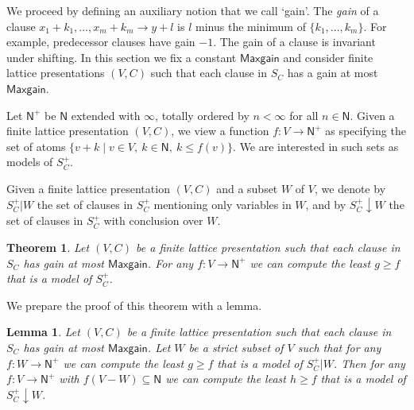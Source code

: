 \documentclass[11pt,a4paper]{article}
\newtheorem{theorem}{Theorem}[section]
\newtheorem{lemma}{Lemma}[theorem]
\newcommand{\N}{\mathsf{N}}
\newcommand\set[1]{\{#1\}}
\newcommand\jbody[3]{{{#1_1}+{#2_1}},\ldots,{{#1_#3}+{#2_#3}}}
\newcommand\Ninf{\N^+}
\newcommand\M{\mathsf{Maxgain}}
\begin{document}
We proceed by defining an auxiliary notion that we call `gain'.
The \emph{gain} of a clause $\jbody{x}{k}{m}\to y+l$ is $l$ 
minus the minimum of $\set{k_1, ... ,k_m}$.
For example, predecessor clauses have gain $-1$.
The gain of a clause is invariant under shifting.
In this section we fix a constant $\M$ and consider
finite lattice presentations $(V,C)$ such that
each clause in $S_C$ has a gain at most $\M$.

Let $\Ninf$ be $\N$ extended with $\infty$, totally ordered
by $n < \infty$ for all $n\in\N$. 
Given a finite lattice presentation $(V,C)$, we view
a function $f: V\to\Ninf$ as specifying the set
of atoms $\set{v+k \mid v\in V,~k\in\N,~k \leq f(v)}$.
We are interested in such sets as models of $S^+_C$.

Given a finite lattice presentation $(V,C)$
and a subset $W$ of $V$, we denote by $S^+_C|W$ 
the set of clauses in $S^+_C$ mentioning only variables in $W$,
and by $S^+_C{\downarrow}W$
the set of clauses in $S^+_C$ with conclusion over $W$.

\begin{theorem}\label{thm:main}
Let  $(V,C)$ be a finite lattice presentation
such that each clause in $S_C$ has gain at most $\M$.
For any $f: V\to\Ninf$ we can compute
the least $g \geq f$ that is a model of $S^+_C$.
\end{theorem}

We prepare the proof of this theorem with a lemma.

\begin{lemma}\label{lem:secondary}
Let  $(V,C)$ be a finite lattice presentation
such that each clause in $S_C$ has gain at most $\M$.
Let $W$ be a strict subset of $V$ such that 
for any $f: W\to\Ninf$ we can compute
the least $g \geq f$ that is a model of $S^+_C|W$.
Then for any $f: V\to\Ninf$ with $f(V-W)\subseteq \N$ we can compute
the least $h \geq f$ that is a model of $S^+_C{\downarrow}W$.
\end{lemma}
\end{document}
